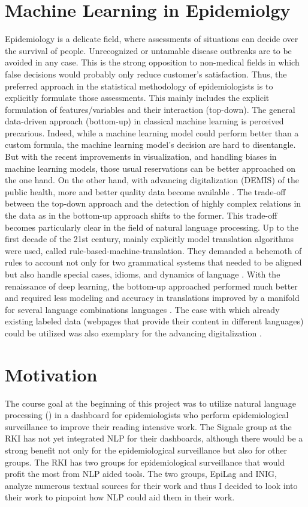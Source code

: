 \section{Machine Learning in Epidemiolgy}
Epidemiology is a delicate field, where assessments of situations can decide over the survival of people. Unrecognized or untamable disease outbreaks are to be avoided in any case. This is the strong opposition to non-medical fields in which false decisions would probably only reduce customer's satisfaction. Thus, the preferred approach in the statistical methodology of epidemiologists is to explicitly formulate those assessments. This mainly includes the explicit formulation of features/variables and their interaction (top-down). The general data-driven approach (bottom-up) in classical machine learning is perceived precarious. Indeed, while a machine learning model could perform better than a custom formula, the machine learning model's decision are hard to disentangle. But with the recent improvements in visualization, and handling biases in machine learning models, those usual reservations can be better approached on the one hand. On the other hand, with advancing digitalization (DEMIS) of the public health, more and better quality data become available \cite{DEMIS}. The trade-off between the top-down approach and the detection of highly complex relations in the data as in the bottom-up approach shifts to the former. This trade-off becomes particularly clear in the field of natural language processing. Up to the first decade of the 21st century, mainly explicitly model translation algorithms were used, called rule-based-machine-translation. They demanded a behemoth of rules to account not only for two grammatical systems that needed to be aligned but also handle special cases, idioms, and dynamics of language \cite{Bar-Hillel1953, Bar-Hillel1960}. With the renaissance of deep learning, the bottom-up approached performed much better and required less modeling and accuracy in translations improved by a manifold for several language combinations languages \cite{Bengio2003}. The ease with which already existing labeled data (webpages that provide their content in different languages) could be utilized was also exemplary for the advancing digitalization \cite{Macklovitch00}.



\section{Motivation}
The course goal at the beginning of this project was to utilize natural language
processing () in a dashboard for epidemiologists who perform epidemiological
surveillance to improve their reading intensive work.
The Signale group at the RKI has not yet integrated NLP for their dashboards, although there would be a strong benefit not only for the epidemiological surveillance but also for other groups. The RKI has two groups for epidemiological surveillance that would profit the most from NLP aided tools. The two groups, EpiLag and INIG, analyze numerous textual sources for their work and thus I decided to look into their work to pinpoint how NLP could aid them in their work.

